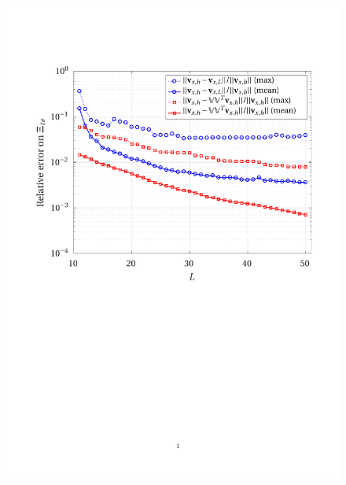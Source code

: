 \documentclass[12pt, a4paper, twoside, openright]{report}
\numberwithin{equation}{chapter}
\theoremstyle{theorem}
\theoremstyle{definition}
\theoremstyle{remark}
\theoremstyle{proposition}
\numberwithin{figure}{chapter}
\begin{document}
	\begin{figure}[H]
		\center
		\includegraphics[scale = 0.75, trim = {1.5cm 12cm 1cm 3.5cm}, clip]{dc_200_vx_error_vs_rank}
	\end{figure}
	
\end{document}
